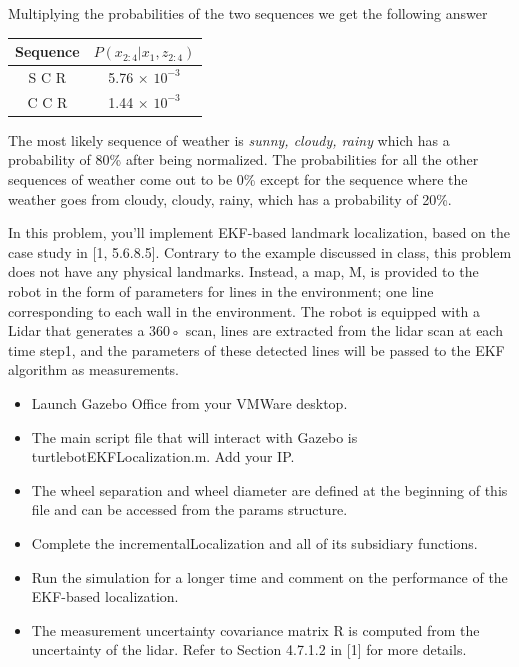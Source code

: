 \documentclass[answers]{exam}
\begin{document}
\begin{questions}
\begin{parts}
\begin{solution}
            Multiplying the probabilities of the two sequences we get the following answer

            \newpage

            \begin{tabular}[h]{|c|c|}
                \hline
                Sequence & $P(x_{2:4}|x_1, z_{2:4})$ \\
                \hline
                S C R    & 5.76 $\times$ $10^{-3}$   \\
                \hline
                C C R    & 1.44 $\times$ $10^{-3}$   \\
                \hline
            \end{tabular}

            The most likely sequence of weather is \textit{sunny, cloudy, rainy} which has
            a probability of 80\% after being normalized. The probabilities for all the
            other sequences of weather come out to be 0\% except for the sequence where the
            weather goes from cloudy, cloudy, rainy, which has a probability of 20\%.
        \end{solution}
    \end{parts}

    \question[20]
    In this problem, you'll implement EKF-based landmark localization, based on the case study
    in [1, 5.6.8.5]. Contrary to the example discussed in class, this problem does not have any
    physical landmarks. Instead, a map, M, is provided to the robot in the form of parameters for
    lines in the environment; one line corresponding to each wall in the environment. The robot
    is equipped with a Lidar that generates a 360◦ scan, lines are extracted from the lidar scan
    at each time step1, and the parameters of these detected lines will be passed to the EKF
    algorithm as measurements.

    \begin{itemize}
        \item Launch Gazebo Office from your VMWare desktop.
        \item The main script file that will interact with Gazebo is
              turtlebotEKFLocalization.m. Add your IP.
        \item The wheel separation and wheel diameter are defined at the beginning of this
              file and can be accessed from the params structure.
        \item Complete the incrementalLocalization and all of its subsidiary functions.
        \item Run the simulation for a longer time and comment on the performance of the
              EKF-based localization.
        \item The measurement uncertainty covariance matrix R is computed from the
              uncertainty of the lidar. Refer to Section 4.7.1.2 in [1] for more details.
    \end{itemize}
    \begin{parts}

\end{parts}
\end{questions}
\end{document}
